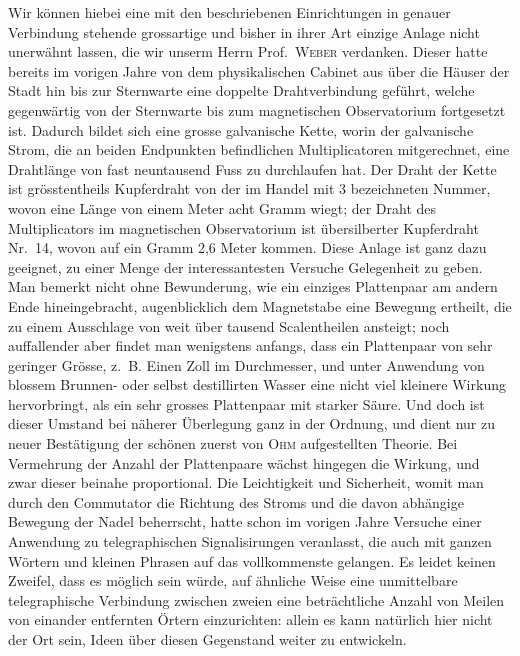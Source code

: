 Wir können hiebei eine mit den beschriebenen Einrichtungen in genauer Verbindung stehende grossartige und bisher in ihrer Art einzige Anlage nicht unerwähnt lassen, die wir unserm Herrn Prof.\ \textsc{Weber} verdanken. Dieser hatte bereits im vorigen Jahre von dem physikalischen Cabinet aus über die Häuser der Stadt hin bis zur Sternwarte eine doppelte Drahtverbindung geführt, welche gegenwärtig von der Sternwarte bis zum magnetischen Observatorium fortgesetzt ist. Dadurch bildet sich eine grosse galvanische Kette, worin der galvanische Strom, die an beiden Endpunkten befindlichen Multiplicatoren mitgerechnet, eine Drahtlänge von fast neuntausend Fuss zu durchlaufen hat. Der Draht der Kette ist grösstentheils Kupferdraht von der im Handel mit 3 bezeichneten Nummer, wovon eine Länge von einem Meter acht Gramm wiegt; der Draht des Multiplicators im magnetischen Observatorium ist übersilberter Kupferdraht Nr.\ 14, wovon auf ein Gramm 2,6 Meter kommen. Diese Anlage ist ganz dazu geeignet, zu einer Menge der interessantesten Versuche Gelegenheit zu geben. Man bemerkt nicht ohne Bewunderung, wie ein einziges Plattenpaar am andern Ende hineingebracht, augenblicklich dem Magnetstabe eine Bewegung ertheilt, die zu einem Ausschlage von weit über tausend Scalentheilen ansteigt; noch auffallender aber findet man wenigstens anfangs, dass ein Plattenpaar von sehr geringer Grösse, z.\ B. Einen Zoll im Durchmesser, und unter Anwendung von blossem Brunnen- oder selbst destillirten Wasser eine nicht viel kleinere Wirkung hervorbringt, als ein sehr grosses Plattenpaar mit starker Säure. Und doch ist dieser Umstand bei näherer Überlegung ganz in der Ordnung, und dient nur zu neuer Bestätigung der schönen zuerst von \textsc{Ohm} aufgestellten Theorie. Bei Vermehrung der Anzahl der Plattenpaare wächst hingegen die Wirkung, und zwar dieser beinahe proportional. Die Leichtigkeit und Sicherheit, womit man durch den Commutator die Richtung des Stroms und die davon abhängige Bewegung der Nadel beherrscht, hatte schon im vorigen Jahre Versuche einer Anwendung zu telegraphischen Signalisirungen veranlasst, die auch mit ganzen Wörtern und kleinen Phrasen auf das vollkommenste gelangen. Es leidet keinen Zweifel, dass es möglich sein würde, auf ähnliche Weise eine unmittelbare telegraphische Verbindung zwischen zweien eine beträchtliche Anzahl von Meilen von einander entfernten Örtern einzurichten: allein es kann natürlich hier nicht der Ort sein, Ideen über diesen Gegenstand weiter zu entwickeln.

